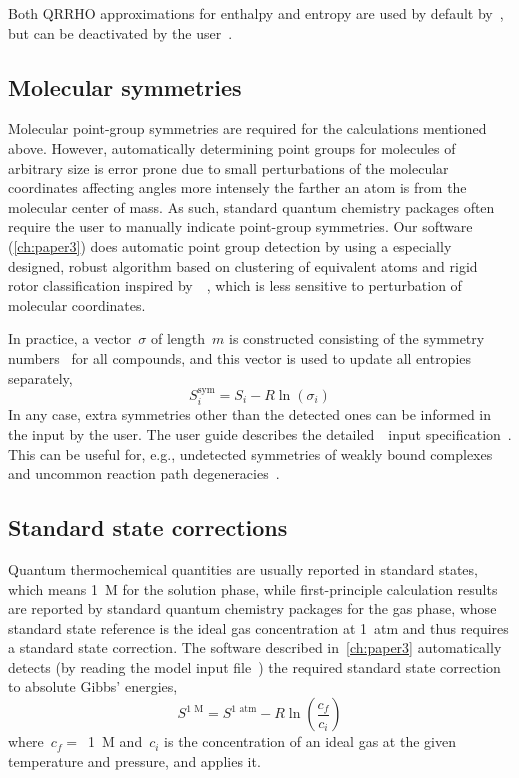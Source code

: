 %
Both QRRHO approximations for enthalpy and entropy are used by default by~\overreact{},
but can be deactivated by the user~\cite{overreactguideinput2022}.

\subsection{Molecular symmetries}%
\label{sec:mol-sym}

Molecular point-group symmetries are required for the calculations mentioned above.
However,
automatically determining point groups for molecules of arbitrary size is error prone due to small perturbations of the molecular coordinates affecting angles more intensely the farther an atom is from the molecular center of mass.
As such,
standard quantum chemistry packages often require the user to manually indicate point-group symmetries.
Our software~\overreact{} (\cref{ch:paper3}) does automatic point group detection by using a especially designed,
robust algorithm based on clustering of equivalent atoms and rigid rotor classification inspired by~\citeauthor{Beruski_2013}~\cite{Beruski_2013},
which is less sensitive to perturbation of molecular coordinates.

In practice,
a vector~$\sigma$ of length~$m$ is constructed consisting of the symmetry numbers~\cite{Fern_ndez_Ramos_2007,Gilson_2010} for all compounds,
and this vector is used to update all entropies separately,
%
\begin{equation}
	S_i^\text{sym}
	= S_i - R \ln{\left( \sigma_i \right)}
\end{equation}
%
In any case,
extra symmetries other than the detected ones can be informed in the input by the user.
The user guide describes the detailed~\overreact{}~input specification~\cite{overreactguideinput2022}.
This can be useful for,
e.g.,
undetected symmetries of weakly bound complexes~\cite{Gilson_2010} and uncommon reaction path degeneracies~\cite{Fern_ndez_Ramos_2007}.

\subsection{Standard state corrections}

Quantum thermochemical quantities are usually reported in standard states,
which means 1~M for the solution phase,
while first-principle calculation results are reported
by standard quantum chemistry packages for the gas phase,
whose standard state reference is the ideal gas concentration at 1~atm
and thus requires a standard state correction.
The software described in~\cref{ch:paper3} automatically detects
(by reading the model input file~\cite{overreactguideinput2022})
the required standard state correction to absolute Gibbs' energies,
%
\begin{equation}
	S^\text{1~M} = S^\text{1~atm}
	- R \ln{\left( \frac{c_f}{c_i} \right)}
\end{equation}
%
where~$c_f =$~1~M and~$c_i$ is the concentration of an ideal gas at the given temperature and pressure,
and applies it.

